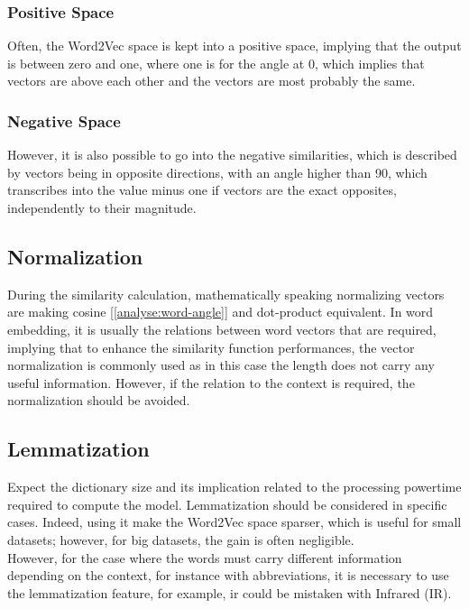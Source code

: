 \subsubsection{Positive Space}
Often, the Word2Vec space is kept into a positive space, implying that the output is between zero and one, where one is for the angle at 0\textdegree, which implies that vectors are above each other and the vectors are most probably the same.

\subsubsection{Negative Space}
However, it is also possible to go into the negative similarities, which is described by vectors being in opposite directions, with an angle higher than 90\textdegree, which transcribes into the value minus one if vectors are the exact opposites, independently to their magnitude. 


\subsection{Normalization}
During the similarity calculation, mathematically speaking normalizing vectors are making cosine [\ref{analyse:word-angle}] and dot-product equivalent. In word embedding, it is usually the relations between word vectors that are required, implying that to enhance the similarity function performances, the vector normalization is commonly used as in this case the length does not carry any useful information. However, if the relation to the context is required, the normalization should be avoided. 


\subsection{Lemmatization}
Expect the dictionary size and its implication related to the processing power\/time required to compute the model. Lemmatization should be considered in specific cases. Indeed, using it make the Word2Vec space sparser, which is useful for small datasets; however, for big datasets, the gain is often negligible. \\

However, for the case where the words must carry different information depending on the context, for instance with abbreviations, it is necessary to use the lemmatization feature, for example, \gls{ir} could be mistaken with Infrared (IR).\\

